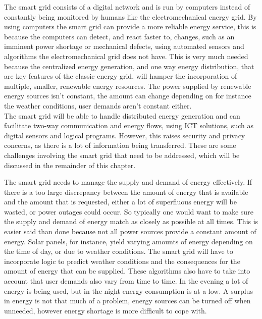 The smart grid consists of a digital network and is run by computers instead of constantly being monitored by humans like the electromechanical energy grid. By using computers the smart grid can provide a more reliable energy service, this is because the computers can detect, and react faster to, changes, such as an imminent power shortage or mechanical defects, using automated sensors and algorithms the electromechanical grid does not have. This is very much needed because the centralized energy generation, and one way energy distribution, that are key features of the classic energy grid, will hamper the incorporation of multiple, smaller, renewable energy resources. The power supplied by renewable energy sources isn't constant, the amount can change depending on for instance the weather conditions, user demands aren't constant either. \\
The smart grid will be able to handle distributed energy generation and can facilitate two-way communication and energy flows, using ICT solutions, such as digital sensors and logical programs. However, this raises security and privacy concerns, as there is a lot of information being transferred. These are some challenges involving the smart grid that need to be addressed, which will be discussed in the remainder of this chapter. 


The smart grid needs to manage the supply and demand of energy effectively. If there is a too large discrepancy between the amount of energy that is available and the amount that is requested, either a lot of superfluous energy will be wasted, or power outages could occur. 
So typically one would want to make sure the supply and demand of energy match as closely as possible at all times. This is easier said than done because not all power sources provide a constant amount of energy. Solar panels, for instance, yield varying amounts of energy depending on the time of day, or due to weather conditions. The smart grid will have to incorporate logic to predict weather conditions and the consequences for the amount of energy that can be supplied. These algorithms also have to take into account that user demands also vary from time to time. In the evening a lot of energy is being used, but in the night energy consumption is at a low. A surplus in energy is not that much of a problem, energy sources can be turned off when unneeded, however energy shortage is more difficult to cope with.


